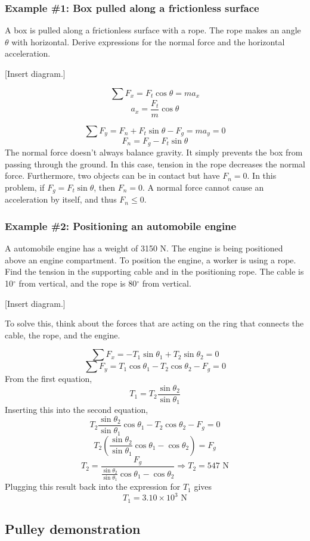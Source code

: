 \subsubsection{Example \#1: Box pulled along a frictionless surface}
A box is pulled along a frictionless surface with a rope. The rope makes an angle $\theta$ with horizontal. Derive expressions for the normal force and the horizontal acceleration.

[Insert diagram.]

$$\sum F_x=F_t\cos\theta=ma_x$$
$$\boxed{a_x=\frac{F_t}{m}\cos\theta}$$

$$\sum F_y=F_n+F_t\sin\theta-F_g=ma_y=0$$
$$\boxed{F_n=F_g-F_t\sin\theta}$$
The normal force doesn't always balance gravity. It simply prevents the box from passing through the ground. In this case, tension in the rope decreases the normal force. Furthermore, two objects can be in contact but have $F_n=0$. In this problem, if $F_g=F_t\sin\theta$, then $F_n=0$. A normal force cannot cause an acceleration by itself, and thus $F_n\leq{0}$. 

\subsubsection{Example \#2: Positioning an automobile engine}
A automobile engine has a weight of 3150 N. The engine is being positioned above an engine compartment. To position the engine, a worker is using a rope. Find the tension in the supporting cable and in the positioning rope. The cable is 10$^\circ$ from vertical, and the rope is 80$^\circ$ from vertical.

[Insert diagram.]
\vspace{3cm}

To solve this, think about the forces that are acting on the ring that connects the cable, the rope, and the engine.

$$\sum F_x = -T_1\sin\theta_1+T_2\sin\theta_2=0$$
$$\sum F_y = T_1\cos\theta_1-T_2\cos\theta_2-F_g = 0$$
From the first equation,
$$T_1=T_2\frac{\sin\theta_2}{\sin\theta_1}$$
Inserting this into the second equation,
$$T_2\frac{\sin\theta_2}{\sin\theta_1}\cos\theta_1-T_2\cos\theta_2-F_g = 0$$
$$T_2\left(\frac{\sin\theta_2}{\sin\theta_1}\cos\theta_1-\cos\theta_2\right)=F_g$$
$$T_2=\frac{F_g}{\frac{\sin\theta_2}{\sin\theta_1}\cos\theta_1-\cos\theta_2}\Rightarrow \boxed{T_2=547\mbox{ N}}$$
Plugging this result back into the expression for $T_1$ gives
$$\boxed{T_1=3.10\times 10^3\mbox{ N}}$$

\subsection{Pulley demonstration}


\clearpage
